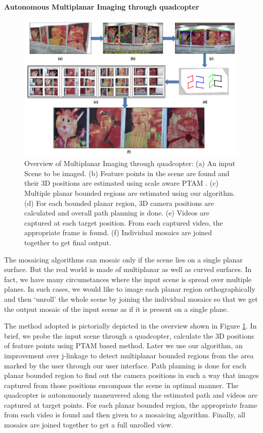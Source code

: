 \noindent \textbf{Autonomous Multiplanar Imaging through quadcopter}\\
\begin{figure}[h!]
\centering
\includegraphics[width=0.98\linewidth]{figures/multiplanar/workflow}
\caption[Overflow of autonomous multiplanar imaging through quadcopter]{Overview
of Multiplanar Imaging through quadcopter:
(a) An input Scene to be imaged.
(b) Feature points in the scene are found and their 3D positions are estimated
using scale aware PTAM \cite{Engel12}. (c) Multiple planar bounded regions are
estimated using our algorithm. (d) For each bounded planar region, 3D camera
positions are calculated and overall path planning is done. (e) Videos are
captured at each target position. From each captured video, the appropriate
frame is found. (f) Individual mosaics are joined together to get final output.}
\label{fig:multiplanar_workflow}
\end{figure}

The mosaicing algorithms can mosaic only if the scene lies on a single planar
surface. But the real world is made of multiplanar as well as curved surfaces.
In fact, we have many circumstances where the input scene is spread over
multiple planes. In such cases, we would like to image each planar region
orthographically and then `unroll' the whole scene by joining the individual
mosaics so that we get the output mosaic of the input scene as if it is present
on a single plane.

The method adopted is pictorially depicted in the overview shown in Figure
\ref{fig:multiplanar_workflow}. In brief, we probe the
input scene through a quadcopter, calculate the 3D positions of feature points
using PTAM based method\cite{engel}. Later we use our algorithm, an improvement
over j-linkage\cite{jlinkage} to detect multiplanar bounded regions from the area
marked by the user through our user interface. Path planning is done for each
planar bounded region to find out the camera positions in such a way
that images captured from those positions encompass the scene in optimal manner.
The quadcopter is autonomously maneuvered along the estimated path and videos
are captured at target points. For each planar bounded region, the appropriate
frame from each video is found and then given to a mosaicing algorithm. 
Finally, all mosaics are joined together to get a full unrolled view.

